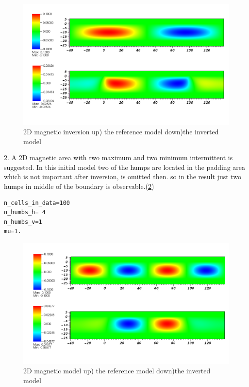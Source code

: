\begin{figure}
\centering
\includegraphics[width=\textwidth]{mag2D2.png}
\caption{2D magnetic inversion up) the reference model  down)the inverted model}
\label{fig:mag2D2}
\end{figure}

2. A 2D magnetic area with two maximum and two minimum intermittent is suggested. In this initial model two of the humps are located in the padding area which is not important after inversion, is omitted then. so in the result just two humps in middle of the boundary is observable.(\ref{fig:mag2D4})

\begin{verbatim}
n_cells_in_data=100
n_humbs_h= 4
n_humbs_v=1
mu=1.
\end{verbatim}

\begin{figure}
\centering
\includegraphics[width=\textwidth]{mag2D4.png}
\caption{2D magnetic model up) the reference model  down)the inverted model}
\label{fig:mag2D4}
\end{figure}

